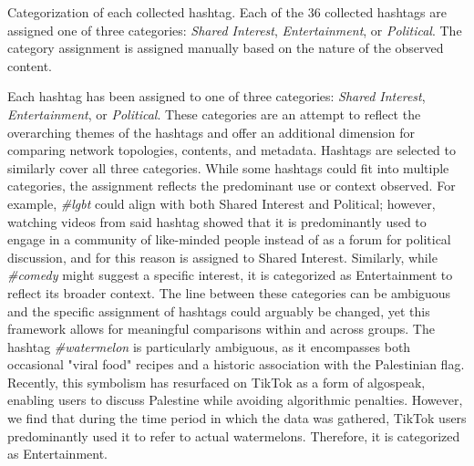 \begin{table}[ht]
    \centering
    
    \caption{Categorization of each collected hashtag. Each of the $36$ collected hashtags are assigned one of three categories: \textit{Shared Interest}, \textit{Entertainment}, or \textit{Political}. The category assignment is assigned manually based on the nature of the observed content.}
    \label{tab:hashtags}
\end{table}

Each hashtag has been assigned to one of three categories: \textit{Shared Interest}, \textit{Entertainment}, or \textit{Political}. These categories are an attempt to reflect the overarching themes of the hashtags and offer an additional dimension for comparing network topologies, contents, and metadata. Hashtags are selected to similarly cover all three categories. While some hashtags could fit into multiple categories, the assignment reflects the predominant use or context observed. For example, \textit{\#lgbt} could align with both Shared Interest and Political; however, watching videos from said hashtag showed that it is predominantly used to engage in a community of like-minded people instead of as a forum for political discussion, and for this reason is assigned to Shared Interest. Similarly, while \textit{\#comedy} might suggest a specific interest, it is categorized as Entertainment to reflect its broader context. The line between these categories can be ambiguous and the specific assignment of hashtags could arguably be changed, yet this framework allows for meaningful comparisons within and across groups. The hashtag \textit{\#watermelon} is particularly ambiguous, as it encompasses both occasional "viral food" recipes and a historic association with the Palestinian flag.  Recently, this symbolism has resurfaced on TikTok as a form of algospeak, enabling users to discuss Palestine while avoiding algorithmic penalties. However, we find that during the time period in which the data was gathered, TikTok users predominantly used it to refer to actual watermelons. Therefore, it is categorized as Entertainment.


